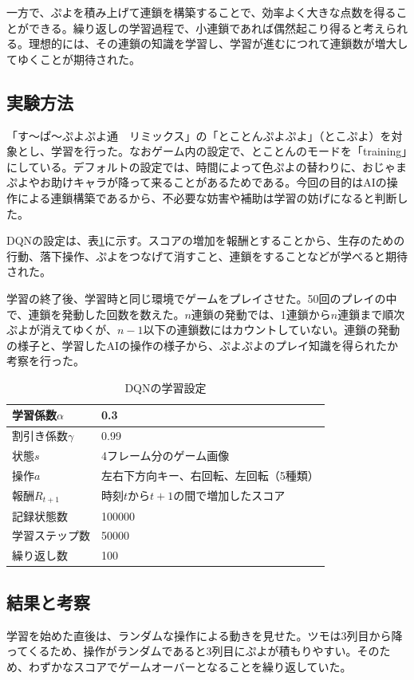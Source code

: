 \documentclass[12pt]{jsarticle}
\begin{document}
一方で、ぷよを積み上げて連鎖を構築することで、効率よく大きな点数を得ることができる。繰り返しの学習過程で、小連鎖であれば偶然起こり得ると考えられる。理想的には、その連鎖の知識を学習し、学習が進むにつれて連鎖数が増大してゆくことが期待された。

\subsection{実験方法}
「す～ぱ～ぷよぷよ通　リミックス」の「とことんぷよぷよ」（とこぷよ）を対象とし、学習を行った。なおゲーム内の設定で、とことんのモードを「training」にしている。デフォルトの設定では、時間によって色ぷよの替わりに、おじゃまぷよやお助けキャラが降って来ることがあるためである。今回の目的はAIの操作による連鎖構築であるから、不必要な妨害や補助は学習の妨げになると判断した。

DQNの設定は、表\ref{tab:dqn_conf}に示す。スコアの増加を報酬とすることから、生存のための行動、落下操作、ぷよをつなげて消すこと、連鎖をすることなどが学べると期待された。

学習の終了後、学習時と同じ環境でゲームをプレイさせた。50回のプレイの中で、連鎖を発動した回数を数えた。$n$連鎖の発動では、1連鎖から$n$連鎖まで順次ぷよが消えてゆくが、$n-1$以下の連鎖数にはカウントしていない。連鎖の発動の様子と、学習したAIの操作の様子から、ぷよぷよのプレイ知識を得られたか考察を行った。

\begin{table}[htb]
\begin{center}
\caption{DQNの学習設定} \label{tab:dqn_conf}
\begin{tabular}{|l|l|} \hline
  学習係数$\alpha$ & 0.3\\ \hline
  割引き係数$\gamma$ & 0.99\\ \hline
  状態$s$ & 4フレーム分のゲーム画像\\ \hline
  操作$a$ & 左右下方向キー、右回転、左回転（5種類）\\ \hline
  報酬$R_{t+1}$ & 時刻$t$から$t+1$の間で増加したスコア\\ \hline
  記録状態数 & 100000\\ \hline
  学習ステップ数 & 50000\\ \hline
  繰り返し数 & 100\\ \hline
\end{tabular}
\end{center}
\end{table}

\subsection{結果と考察}
学習を始めた直後は、ランダムな操作による動きを見せた。ツモは3列目から降ってくるため、操作がランダムであると3列目にぷよが積もりやすい。そのため、わずかなスコアでゲームオーバーとなることを繰り返していた。
\end{document}
